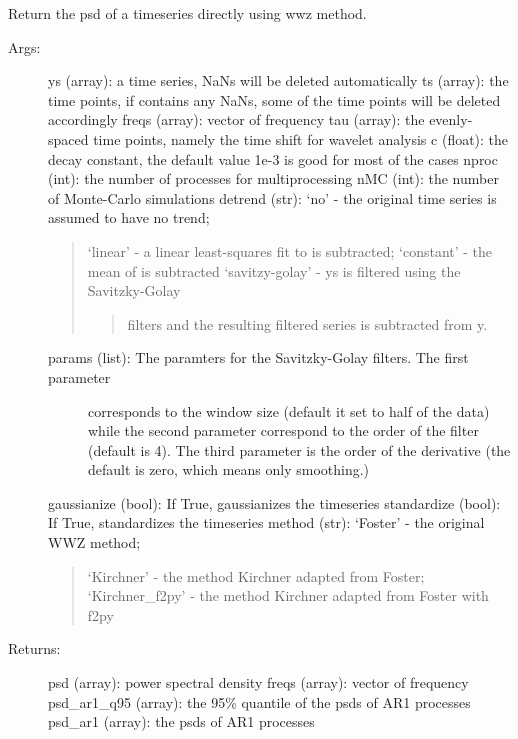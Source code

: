 \documentclass[letterpaper,10pt,english]{sphinxmanual}
\begin{document}
\begin{fulllineitems}
\label{\detokenize{Spectral:pyleoclim.Spectral.wwz_psd}}
Return the psd of a timeseries directly using wwz method.
\begin{description}
\item[{Args:}] \leavevmode
ys (array): a time series, NaNs will be deleted automatically
ts (array): the time points, if  contains any NaNs, some of the time points will be deleted accordingly
freqs (array): vector of frequency
tau (array): the evenly-spaced time points, namely the time shift for wavelet analysis
c (float): the decay constant, the default value 1e-3 is good for most of the cases
nproc (int): the number of processes for multiprocessing
nMC (int): the number of Monte-Carlo simulations
detrend (str): ‘no’ - the original time series is assumed to have no trend;
\begin{quote}

‘linear’ - a linear least-squares fit to  is subtracted;
‘constant’ - the mean of  is subtracted
‘savitzy-golay’ - ys is filtered using the Savitzky-Golay
\begin{quote}

filters and the resulting filtered series is subtracted from y.
\end{quote}
\end{quote}
\begin{description}
\item[{params (list): The paramters for the Savitzky-Golay filters. The first parameter}] \leavevmode
corresponds to the window size (default it set to half of the data)
while the second parameter correspond to the order of the filter
(default is 4). The third parameter is the order of the derivative
(the default is zero, which means only smoothing.)

\end{description}

gaussianize (bool): If True, gaussianizes the timeseries
standardize (bool): If True, standardizes the timeseries
method (str): ‘Foster’ - the original WWZ method;
\begin{quote}

‘Kirchner’ - the method Kirchner adapted from Foster;
‘Kirchner\_f2py’ - the method Kirchner adapted from Foster with f2py
\end{quote}

\item[{Returns:}] \leavevmode
psd (array): power spectral density
freqs (array): vector of frequency
psd\_ar1\_q95 (array): the 95\% quantile of the psds of AR1 processes
psd\_ar1 (array): the psds of AR1 processes

\end{description}

\end{fulllineitems}
\end{document}
